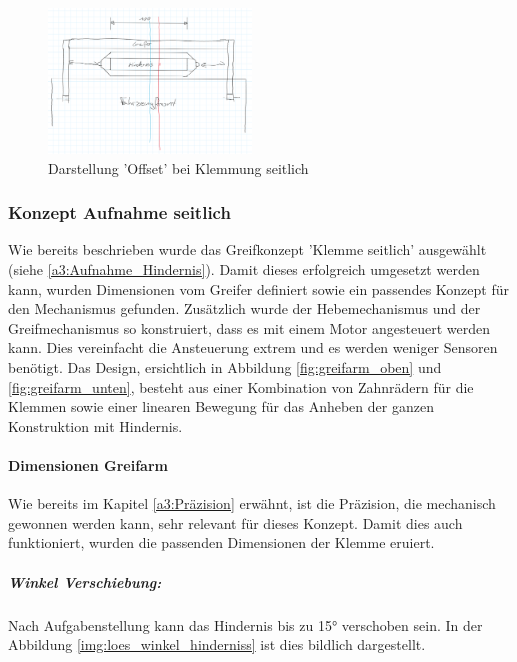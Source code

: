 \documentclass[../main.tex]{subfiles}
\begin{document}
        \begin{figure}[h!]
            \centering
            \includegraphics[width=0.48\textwidth]{img/konzeptfindung/Klemme_Langsweg_off_center.png}
            \caption{Darstellung 'Offset' bei Klemmung seitlich}
        \label{img:konzept_zentrierung_3}
        \end{figure}  

\newpage

\subsubsection{Konzept Aufnahme seitlich}
\label{a3:Aufnahme_seitlich}
Wie bereits beschrieben wurde das Greifkonzept 'Klemme seitlich' ausgewählt (siehe \ref{a3:Aufnahme_Hindernis}).
Damit dieses erfolgreich umgesetzt werden kann, wurden Dimensionen vom Greifer definiert  sowie ein passendes Konzept für den Mechanismus gefunden. Zusätzlich wurde der Hebemechanismus und der Greifmechanismus so konstruiert, dass es mit einem Motor angesteuert werden kann. Dies vereinfacht die Ansteuerung extrem und es werden weniger Sensoren benötigt.
Das Design, ersichtlich in Abbildung \ref{fig:greifarm_oben} und \ref{fig:greifarm_unten}, besteht aus einer Kombination von Zahnrädern für die Klemmen sowie einer linearen Bewegung für das Anheben der ganzen Konstruktion mit Hindernis.

\paragraph{Dimensionen Greifarm}
Wie bereits im Kapitel \ref{a3:Präzision} erwähnt, ist die Präzision, die mechanisch gewonnen werden kann, sehr relevant für dieses Konzept. Damit dies auch funktioniert, wurden die passenden Dimensionen der Klemme eruiert. 

\subparagraph{Winkel Verschiebung:} \label{loes:winkel_verschiebung}
Nach Aufgabenstellung kann das Hindernis bis zu 15° verschoben sein.
In der Abbildung \ref{img:loes_winkel_hinderniss} ist dies bildlich dargestellt.
\end{document}
